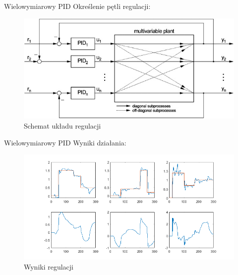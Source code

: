 \begin{frame}{Wielowymiarowy PID}
Określenie pętli regulacji:
	\begin{center}
		\begin{figure}[H]
            		\includegraphics[scale=0.7]{images/MPID.jpg}
          			 \caption{Schemat układu regulacji}
		\end{figure}
	\end{center}
\end{frame}

\begin{frame}{Wielowymiarowy PID}
Wyniki działania:
	\begin{center}
		\begin{figure}[H]
            		\includegraphics[scale=0.5]{images/PID_wyniki.png} %
          			 \caption{Wyniki regulacji}
		\end{figure}
	\end{center}
\end{frame}

